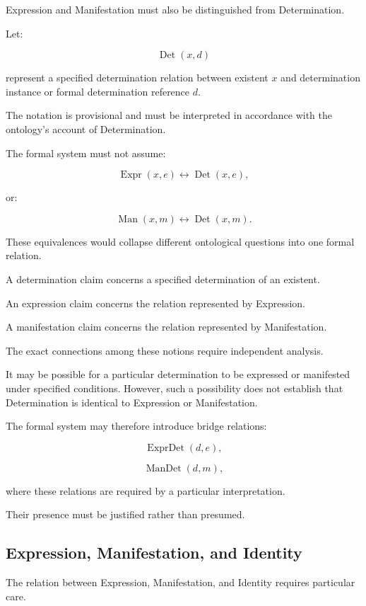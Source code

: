 Expression and Manifestation
must also be distinguished
from Determination.

Let:

\[
    \operatorname{Det}(x,d)
\]

represent a specified determination
relation between existent \(x\)
and determination instance or
formal determination reference \(d\).

The notation is provisional
and must be interpreted in
accordance with the ontology's
account of Determination.

The formal system must not
assume:

\[
    \operatorname{Expr}(x,e)
    \leftrightarrow
    \operatorname{Det}(x,e),
\]

or:

\[
    \operatorname{Man}(x,m)
    \leftrightarrow
    \operatorname{Det}(x,m).
\]

These equivalences would collapse
different ontological questions
into one formal relation.

A determination claim concerns
a specified determination of
an existent.

An expression claim concerns
the relation represented by
Expression.

A manifestation claim concerns
the relation represented by
Manifestation.

The exact connections among
these notions require independent
analysis.

It may be possible for a
particular determination to
be expressed or manifested
under specified conditions.
However, such a possibility
does not establish that
Determination is identical
to Expression or Manifestation.

The formal system may therefore
introduce bridge relations:

\[
    \operatorname{ExprDet}(d,e),
\]

\[
    \operatorname{ManDet}(d,m),
\]

where these relations are
required by a particular
interpretation.

Their presence must be justified
rather than presumed.

\subsection{Expression, Manifestation, and Identity}

The relation between Expression,
Manifestation, and Identity
requires particular care.

